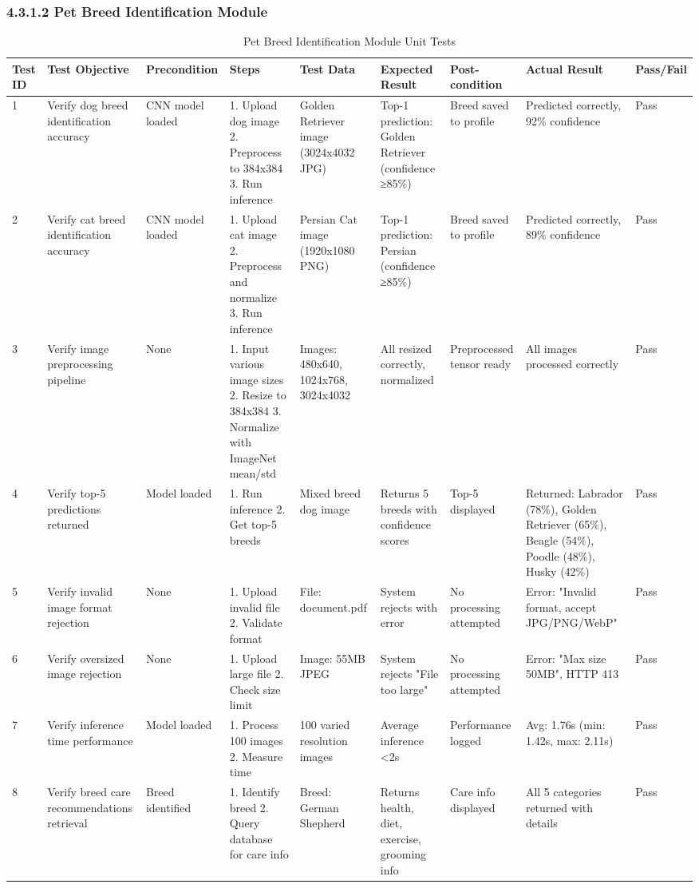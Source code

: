 \subsubsection{4.3.1.2 Pet Breed Identification Module}

\begin{table}[H]
\centering
\caption{Pet Breed Identification Module Unit Tests}
\tiny
\begin{tabular}{|p{0.4cm}|p{2cm}|p{1.2cm}|p{2cm}|p{2cm}|p{2cm}|p{1.5cm}|p{2cm}|p{0.7cm}|}
\hline
\textbf{Test ID} & \textbf{Test Objective} & \textbf{Precondition} & \textbf{Steps} & \textbf{Test Data} & \textbf{Expected Result} & \textbf{Post-condition} & \textbf{Actual Result} & \textbf{Pass/Fail} \\ \hline
1 & Verify dog breed identification accuracy & CNN model loaded & 1. Upload dog image 2. Preprocess to 384x384 3. Run inference & Golden Retriever image (3024x4032 JPG) & Top-1 prediction: Golden Retriever (confidence ≥85\%) & Breed saved to profile & Predicted correctly, 92\% confidence & Pass \\ \hline
2 & Verify cat breed identification accuracy & CNN model loaded & 1. Upload cat image 2. Preprocess and normalize 3. Run inference & Persian Cat image (1920x1080 PNG) & Top-1 prediction: Persian (confidence ≥85\%) & Breed saved to profile & Predicted correctly, 89\% confidence & Pass \\ \hline
3 & Verify image preprocessing pipeline & None & 1. Input various image sizes 2. Resize to 384x384 3. Normalize with ImageNet mean/std & Images: 480x640, 1024x768, 3024x4032 & All resized correctly, normalized & Preprocessed tensor ready & All images processed correctly & Pass \\ \hline
4 & Verify top-5 predictions returned & Model loaded & 1. Run inference 2. Get top-5 breeds & Mixed breed dog image & Returns 5 breeds with confidence scores & Top-5 displayed & Returned: Labrador (78\%), Golden Retriever (65\%), Beagle (54\%), Poodle (48\%), Husky (42\%) & Pass \\ \hline
5 & Verify invalid image format rejection & None & 1. Upload invalid file 2. Validate format & File: document.pdf & System rejects with error & No processing attempted & Error: "Invalid format, accept JPG/PNG/WebP" & Pass \\ \hline
6 & Verify oversized image rejection & None & 1. Upload large file 2. Check size limit & Image: 55MB JPEG & System rejects "File too large" & No processing attempted & Error: "Max size 50MB", HTTP 413 & Pass \\ \hline
7 & Verify inference time performance & Model loaded & 1. Process 100 images 2. Measure time & 100 varied resolution images & Average inference <2s & Performance logged & Avg: 1.76s (min: 1.42s, max: 2.11s) & Pass \\ \hline
8 & Verify breed care recommendations retrieval & Breed identified & 1. Identify breed 2. Query database for care info & Breed: German Shepherd & Returns health, diet, exercise, grooming info & Care info displayed & All 5 categories returned with details & Pass \\ \hline
\end{tabular}
\label{tab:breed_tests}
\end{table}

